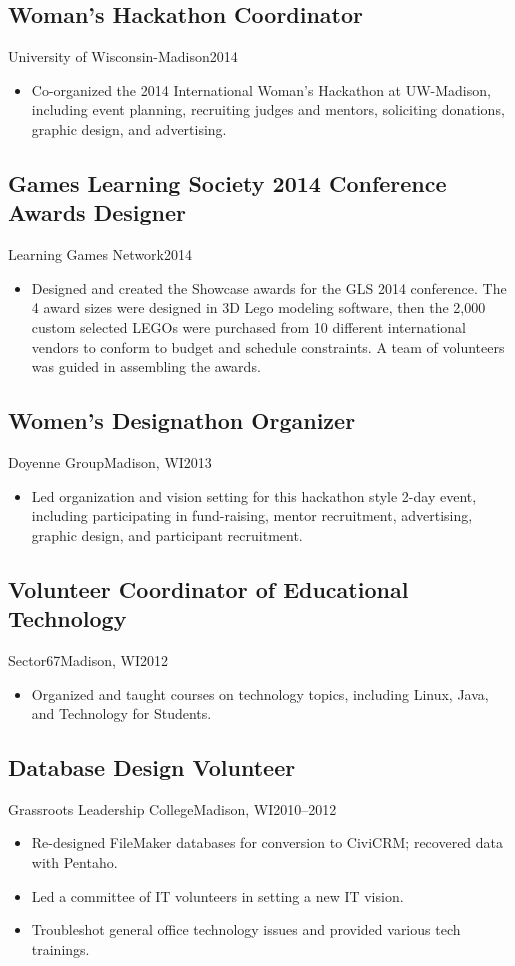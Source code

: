 \documentclass[../main.tex]{subfiles}
\begin{document}
\subsection{Woman's Hackathon Coordinator}{University of Wisconsin-Madison}{2014}{}
\begin{itemize}
		\item{Co-organized the 2014 International Woman's Hackathon at UW-Madison, including event planning, recruiting judges and mentors, soliciting donations, graphic design, and advertising.}
	\end{itemize}

\subsection{Games Learning Society 2014 Conference Awards Designer}{Learning Games Network}{2014}{}
\begin{itemize}
		\item{Designed and created the Showcase awards for the GLS 2014 conference. The 4 award sizes were designed in 3D Lego modeling software, then the 2,000 custom selected LEGOs were purchased from 10 different international vendors to conform to budget and schedule constraints. A team of volunteers was guided in assembling the awards.}
	\end{itemize}

	\subsection{Women's Designathon Organizer}{Doyenne Group}{Madison, WI}{2013}{}
	\begin{itemize}
		\item{Led organization and vision setting for this hackathon style 2-day event, including participating in fund-raising, mentor recruitment, advertising, graphic design, and participant recruitment.}
	\end{itemize}


	\subsection{Volunteer Coordinator of Educational Technology}{Sector67}{Madison, WI}{2012}{}
	\begin{itemize}
		\item{Organized and taught courses on technology topics, including Linux, Java, and Technology for Students.}
	\end{itemize}

	\subsection{Database Design Volunteer}{Grassroots Leadership College}{Madison, WI}{2010--2012}{}
	\begin{itemize}
		\item{Re-designed FileMaker databases for conversion to CiviCRM; recovered data with Pentaho.}
		\item{Led a committee of IT volunteers in setting a new IT vision.}
		\item{Troubleshot general office technology issues and provided various tech trainings.}
	\end{itemize}
\end{document}
